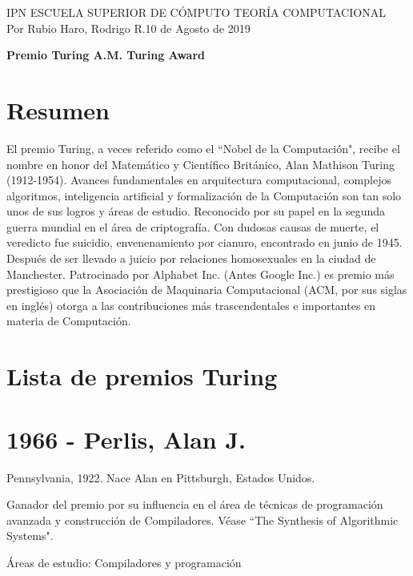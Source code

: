 \documentclass[a4paper, 11pt]{article}
\begin{document}
\noindent
\normalsize IPN \hfill \textbar \hfill ESCUELA SUPERIOR DE CÓMPUTO \hfill \textbar \hfill TEORÍA COMPUTACIONAL \\
Por Rubio Haro, Rodrigo R.\hfill 10 de Agosto de 2019 \\
 
\begin{center}
    \large\textbf{Premio Turing \textbar \hspace{.1mm} A.M. Turing Award} \\
\end{center}


\section*{Resumen}
El premio Turing, a veces referido como el ``Nobel de la Computación", recibe el nombre en honor del Matemático y Científico Británico, Alan Mathison Turing (1912-1954). Avances fundamentales en arquitectura computacional, complejos algoritmos, inteligencia artificial y formalización de la Computación son tan solo unos de sus logros y áreas de estudio. Reconocido por su papel en la segunda guerra mundial en el área de criptografía. Con dudosas causas de muerte, el veredicto fue suicidio, envenenamiento por cianuro, encontrado en junio de 1945. Después de ser llevado a juicio por relaciones homosexuales en la ciudad de Manchester.
Patrocinado por Alphabet Inc. (Antes Google Inc.) es premio más prestigioso que la Asociación de Maquinaria Computacional (ACM, por sus siglas en inglés) otorga a las contribuciones más trascendentales e importantes en materia de Computación.


\section*{Lista de premios Turing}

\section*{1966 - Perlis, Alan J.}
\noindent Pennsylvania, 1922. Nace Alan en Pittsburgh, Estados Unidos.

\noindent Ganador del premio por su influencia en el área de técnicas de programación avanzada y construcción de Compiladores. Véase ``The Synthesis of Algorithmic Systems". 

\noindent Áreas de estudio: Compiladores y programación
\end{document}
